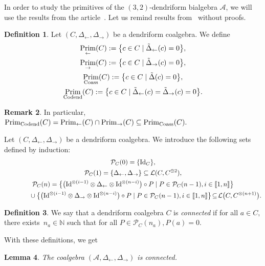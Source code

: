 \documentclass[10pt,a4paper]{amsart}
\numberwithin{equation}{section}
\theoremstyle{definition}
\newtheorem{defi}{Definition}[section]
\newtheorem{Rq}[defi]{Remark}
\theoremstyle{plain}
\newtheorem{Lemme}[defi]{Lemma}
\newcommand{\IEM}[2]{\llbracket #1,#2 \rrbracket}
\newcommand{\N}{\mathbb{N}}
\DeclareMathOperator{\Prim}{Prim}
\begin{document}
In order to study the primitives of the $(3,2)$-dendriform bialgebra $\mathcal{A}$, we will use the results from the article~\cite{bidend}. Let us remind results from~\cite{bidend} without proofs.

\begin{defi}
	Let $(C,\Delta_{\leftarrow},\Delta_{\rightarrow})$ be a dendriform coalgebra. We define
	\begin{gather*}
		\Prim_{\leftarrow}(C) :=\big\{ c\in C \mid \tilde{\Delta}_{\leftarrow}(c)=0 \big\}, \\
		\Prim_{\rightarrow}(C) :=\big\{ c\in C \mid \tilde{\Delta}_{\rightarrow}(c)=0 \big\}, \\
		\Prim_{\rm Coass}(C) :=\big\{ c\in C \mid \tilde{\Delta}(c)=0 \big\},\\
		\Prim_{\rm Codend}(C) :=\big\{ c\in C \mid \tilde{\Delta}_{\leftarrow}(c)=\tilde{\Delta}_{\rightarrow}(c)=0 \big\}.
	\end{gather*}
\end{defi}

\begin{Rq}
	In particular, $\Prim_{\rm Codend}(C)=\Prim_{\leftarrow}(C)\cap \Prim_{\rightarrow}(C)\subseteq\Prim_{\rm Coass}(C).$
\end{Rq}
Let $(C,\Delta_{\leftarrow},\Delta_{\rightarrow})$ be a dendriform coalgebra. We introduce the following sets defined by induction:
	\begin{gather*}
		\mathcal{P}_C(0)=\{{\rm Id}_C\}, \\
		\mathcal{P}_C(1)=\{\Delta_{\leftarrow},\Delta_{\rightarrow}\}\subseteq \mathcal{L}(C,C^{\otimes 2}), \\
		\mathcal{P}_C(n)=\big\lbrace \big( {\rm Id}^{\otimes(i-1)}\otimes \Delta_{\leftarrow} \otimes {\rm Id}^{\otimes (n-i)} \big)\circ P \mid P\in\mathcal{P}_C(n-1), i\in\IEM{1}{n} \big\rbrace \\
		 \hphantom{\mathcal{P}_C(n)=}{}\cup \big\lbrace \big( {\rm Id}^{\otimes(i-1)}\otimes \Delta_{\rightarrow} \otimes {\rm Id}^{\otimes (n-i)} \big)\circ P \mid P\in\mathcal{P}_C(n-1), i\in\IEM{1}{n} \big\rbrace \! \subseteq\! \mathcal{L}\big(C,C^{\otimes (n+1)}\big).
	\end{gather*}
\begin{defi}
	We say that a dendriform coalgebra $C$ is \emph{connected} if for all $a\in C,$ there exists~$n_a\in\N$ such that for all $P\in\mathcal{P}_C(n_a), P(a)=0.$
\end{defi}

{\samepage With these definitions, we get
\begin{Lemme}
	The coalgebra $(\mathcal{A},\Delta_{\leftarrow},\Delta_{\rightarrow})$ is connected.
\end{Lemme}

}
\end{document}
